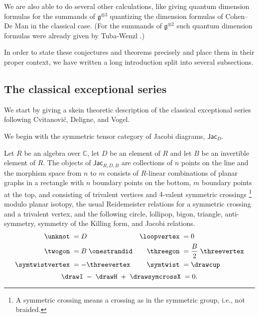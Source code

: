 \documentclass[12pt]{amsart}
\begin{document}
We are also able to do several other calculations, like giving quantum
dimension formulas for the summands of $\mathfrak{g}^{\otimes 3}$ quantizing
the dimension formulas of Cohen--De Man \cite{MR1381778} in the classical case.
(For the summands of $\mathfrak{g}^{\otimes 2}$ such quantum dimension
formulas were already given by Tuba-Wenzl \cite{MR2132671}.)

In order to state these conjectures and theorems precisely and place them in
their proper context, we have written a  long introduction split into several
subsections.

\subsection{The classical exceptional series}
\label{sec:intro-classical}
We start by giving a skein theoretic
description of the classical exceptional series following Cvitanović, Deligne,
and Vogel.


We begin with the symmetric tensor category of Jacobi
diagrams, $\mathsf{Jac}_D$.

\begin{definition}
Let $R$ be an algebra over $\mathbb{C}$, let $D$ be an element of $R$
and let
$B$ be an invertible element of $R$.  The objects of $\mathsf{Jac}_{R,D,B}$ are
collections of $n$ points on the line and the morphism space from $n$ to $m$
consists of $R$-linear combinations of planar graphs in a rectangle with $n$
boundary points on the bottom, $m$ boundary points at the top, and consisting
of trivalent vertices and $4$-valent symmetric crossings%
\footnote{A symmetric crossing means a crossing as in the symmetric
  group, i.e., not braided.}
modulo planar isotopy, the usual Reidemeister relations
for a symmetric crossing and a trivalent vertex, and the following
circle, lollipop, bigon,
triangle, anti-symmetry, symmetry of the Killing form, and Jacobi relations.
\begin{align}
\label{eq:classical-loop-lollipop}  \unknot \; &= D &  \loopvertex \; &=0 \\
\label{eq:classical-bigon-trigon}  \twogon\; &= B \;\onestrandid  & \threegon\; &= \frac{B}{2} \;\threevertex \\
\label{eq:classical-symmetry-antisymmetry}   \symtwistvertex\; &= - \threevertex & \symtwist\; &= \drawcup
\end{align}
\begin{equation}
\drawI\; - \;\drawH\; + \;\drawsymcrossX\; = 0.
\label{eq:IHX}
\end{equation}
\end{definition}
\end{document}
